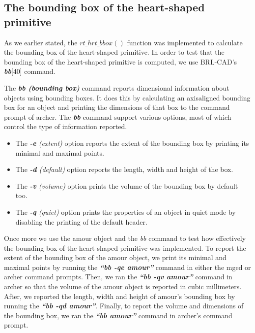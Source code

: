 
\subsection{The bounding box of the heart-­shaped primitive}

As   we   earlier   stated,   the   $rt\_hrt\_bbox()$   function   was   implemented   to
 calculate   the   bounding   box   of   the   heart-­shaped   primitive.   In   order   to   test   that  
the   bounding   box   of   the   heart-­shaped   primitive   is   computed,   we   use  
BRL­-CAD's \textit{\textbf{bb}}[40] command.

\hspace{30} The   \textit{\textbf{bb (bounding box)}}  command   reports   dimensional   information   about   objects   using  
bounding   boxes.   It   does   this   by   calculating   an   axis­aligned   bounding   box   for   an  
object   and   printing   the   dimensions   of   that   box   to   the   command   prompt   of  
archer.   The   \textit{\textbf{bb}}   command   support   various   options,   most   of   which   control   the  
type of information reported.  

\begin{itemize}
\item The \textit{\textbf{-­e} (extent)} option reports the extent of the bounding box by printing its minimal and maximal points.  
\item The \textit{\textbf{-­d} (default)} option reports the length, width and height of the box.  
\item The \textit{\textbf{-­v} (volume)} option prints the volume of the bounding box by default too.  
\item The \textit{\textbf{-­q} (quiet)} option prints the properties of an object in quiet mode by disabling the printing of the default header.
\end{itemize}

\hspace{30} Once   more   we   use   the   amour   object   and   the   \textit{bb}   command   to   test   how  
effectively   the   bounding   box   of   the   heart­-shaped   primitive   was   implemented.  
To   report   the   extent   of   the   bounding   box   of   the   amour   object,   we   print   its  
minimal   and   maximal   points   by   running   the   \textit{\textbf{“bb   ­-qe   amour”}}   command   in   either  
the   mged   or   archer   command   prompts.   Then,   we   ran   the   \textit{\textbf{“bb   -­qv   amour”}}  
command   in   archer   so   that   the   volume   of   the   amour   object   is   reported   in   cubic  
millimeters.   After,   we   reported   the   length,   width   and   height   of   amour's   bounding  
box   by   running   the   \textit{\textbf{“bb   ­-qd   amour”}}.   Finally,   to   report   the   volume   and  
dimensions   of   the   bounding   box,   we   ran   the   \textit{\textbf{“bb   amour”}}   command   in   archer's  
command prompt. 

